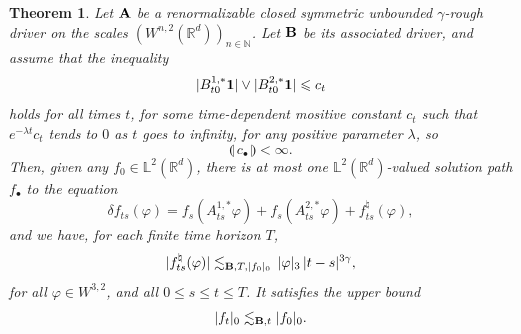 \documentclass[11pt,a4paper]{amsart}
\newcommand{\NN}{\mathbb{N}}  \newcommand{\ZZ}{\mathbb{Z}}  \newcommand{\QQ}{\mathbb{Q}}  \newcommand{\HH}{\mathbb{H}}
\newcommand{\RR}{\mathbb{R}}  \newcommand{\CC}{\mathbb{C}}  \newcommand{\LL}{\mathbb{L}}  \newcommand{\WW}{\mathbb{W}}
\renewcommand{\leq}{\leqslant}
\theoremstyle{plain}%
\newtheorem{theorem}{Theorem}
\theoremstyle{definition}
\theoremstyle{remark}
\numberwithin{equation}{section} %
\begin{document}
\begin{theorem}
\label{ThmRDEHilbertGeneralClosed}
Let $\bf A$ be a renormalizable  \emph{closed symmetric} unbounded $\gamma$-rough driver on the scales $(W^{n,2}(\RR^d))_{n\in\NN}$. Let $\bf B$ be its associated driver, and assume that the inequality
\begin{equation}
\label{BoundPhi}
|B^{1,*}_{t0}{\bf 1} | \vee |B^{2,*}_{t0} {\bf 1} | \leq c_t
\end{equation}
holds for all times $t$, for some time-dependent mositive constant $c_t$ such that $e^{-\lambda t}c_t$ tends to $0$ as $t$ goes to infinity, for any positive parameter $\lambda$, so
$$
\llparenthesis\,c_\bullet\,\rrparenthesis < \infty.
$$
 Then, given any $f_0\in\LL^2(\RR^d)$, there is at most one $\LL^2(\RR^d)$-valued solution path $f_\bullet$ to the equation
\begin{equation}
\label{EqLinearRDEHilbert}
\delta f_{ts}(\varphi) = f_s (A^{1,*}_{ts}\varphi ) + f_s(A^{2,*}_{ts}\varphi) + f^\natural_{ts}(\varphi),
\end{equation}
and we have, for each finite time horizon $T$, 
\begin{equation}
\label{EqBoundRemainder}
| f^\natural_{ts}(\varphi) | \lesssim_{{\bf B},T, | f_0|_0}\,|\varphi|_3\,|t-s|^{3\gamma},
\end{equation}
for all $\varphi\in W^{3,2}$, and all $0\leq s\leq t\leq T$. It satisfies the upper bound
\begin{equation}
\label{EqAPrioriBoundNorm}
| f_t|_0\lesssim_{{\bf B}, t} | f_0|_0  .
\end{equation}
\end{theorem}

\smallskip
 
\end{document}

